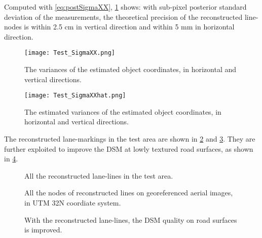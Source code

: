 Computed with \cref{eq:postSigmaXX}, \cref{fig:TestSigmxxhat} shows: with sub-pixel posterior standard deviation of the measurements, the theoretical precision of the reconstructed line-nodes is within 2.5 cm in vertical direction and within 5 mm in horizontal direction. 

\begin{figure}
  \centering
  \texttt{[image: Test\_SigmaXX.png]}
  \caption{\small The variances of the estimated object coordinates, in horizontal and vertical directions.}
  \label{fig:TestSigmxx}
  \vspace{0.5cm}
  \centering
  \texttt{[image: Test\_SigmaXXhat.png]}
  \caption{\small The estimated variances of the estimated object coordinates, in horizontal and vertical directions.}
  \label{fig:TestSigmxxhat}
\end{figure}

The reconstructed lane-markings in the test area are shown in \cref{fig:TestAll3D} and \cref{fig:TestAll2D}. They are further exploited to improve the DSM at lowly textured road surfaces, as shown in \cref{fig:DSMcomparison}.

\begin{figure}
	\centering
	
	\caption{\small All the reconstructed lane-lines in the test area.}
	\label{fig:TestAll3D}
\end{figure}

\begin{figure}
	\centering
	
	
	\caption{\small All the nodes of reconstructed lines on georeferenced aerial images, in UTM 32N coordiate system.}
	\label{fig:TestAll2D}
\end{figure}

\begin{figure}
	\centering
	
	\caption{\small With the reconstructed lane-lines, the DSM quality on road surfaces is improved.}
	\label{fig:DSMcomparison}
\end{figure}